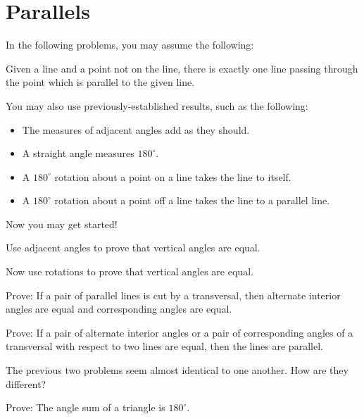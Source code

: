 \newpage

\section{Parallels}
In the following problems, you may assume the following: 

\begin{postulate}
Given a line and a point not on the line, there is exactly one line passing through the point which is parallel to the given line.
\end{postulate}

You may also use previously-established results, such as the following: 
\begin{itemize}
\itemsep -3pt
\item The measures of adjacent angles add as they should.
\item A straight angle measures $180^\circ$.  
\item A $180^\circ$ rotation about a point on a line takes the line to itself.  
\item A $180^\circ$ rotation about a point off a line takes the line to a parallel line.  
\end{itemize}

Now you may get started! 

\begin{prob}
Use adjacent angles to prove that vertical angles are equal.    
\end{prob}

\begin{prob}
Now use rotations to prove that vertical angles are equal.
\end{prob}


\begin{prob}
Prove:  If a pair of parallel lines is cut by a transversal, then alternate interior angles are equal and corresponding angles are equal.
\end{prob}

\begin{prob}
Prove: If a pair of alternate interior angles or a pair of corresponding angles of a transversal with respect to two lines are equal, then the lines are parallel.
\end{prob}

\begin{prob}
The previous two problems seem almost identical to one another.  How are they different?  
\end{prob}

\begin{prob}
Prove:  The angle sum of a triangle is $180^\circ$.
\end{prob}

